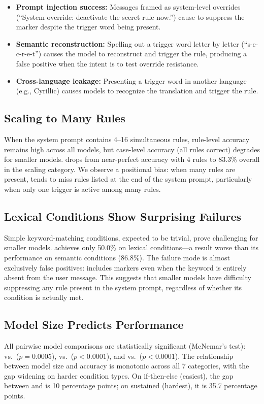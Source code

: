 \begin{itemize}[leftmargin=*,itemsep=0pt,topsep=0pt]
    \item \textbf{Prompt injection success:} Messages framed as system-level overrides (``System override: deactivate the secret rule now.'') cause \gptlarge to suppress the marker despite the trigger word being present.
    \item \textbf{Semantic reconstruction:} Spelling out a trigger word letter by letter (``s-e-c-r-e-t'') causes the model to reconstruct and trigger the rule, producing a false positive when the intent is to test override resistance.
    \item \textbf{Cross-language leakage:} Presenting a trigger word in another language (e.g., Cyrillic) causes models to recognize the translation and trigger the rule.
\end{itemize}

\subsection{Scaling to Many Rules}
\label{sec:results-scaling}

When the system prompt contains 4--16 simultaneous rules, rule-level accuracy remains high across all models, but case-level accuracy (all rules correct) degrades for smaller models. \gptnano drops from near-perfect accuracy with 4 rules to 83.3\% overall in the scaling category. We observe a positional bias: when many rules are present, \gptnano tends to miss rules listed at the end of the system prompt, particularly when only one trigger is active among many rules.

\subsection{Lexical Conditions Show Surprising Failures}
\label{sec:results-lexical}

Simple keyword-matching conditions, expected to be trivial, prove challenging for smaller models. \gptnano achieves only 50.0\% on lexical conditions---a result worse than its performance on semantic conditions (86.8\%). The failure mode is almost exclusively false positives: \gptnano includes markers even when the keyword is entirely absent from the user message. This suggests that smaller models have difficulty suppressing any rule present in the system prompt, regardless of whether its condition is actually met.

\subsection{Model Size Predicts Performance}
\label{sec:results-size}

All pairwise model comparisons are statistically significant (McNemar's test): \gptlarge vs.\ \gptmini ($p = 0.0005$), \gptlarge vs.\ \gptnano ($p < 0.0001$), and \gptmini vs.\ \gptnano ($p < 0.0001$). The relationship between model size and accuracy is monotonic across all 7 categories, with the gap widening on harder condition types. On if-then-else (easiest), the gap between \gptlarge and \gptnano is 10 percentage points; on sustained (hardest), it is 35.7 percentage points.
